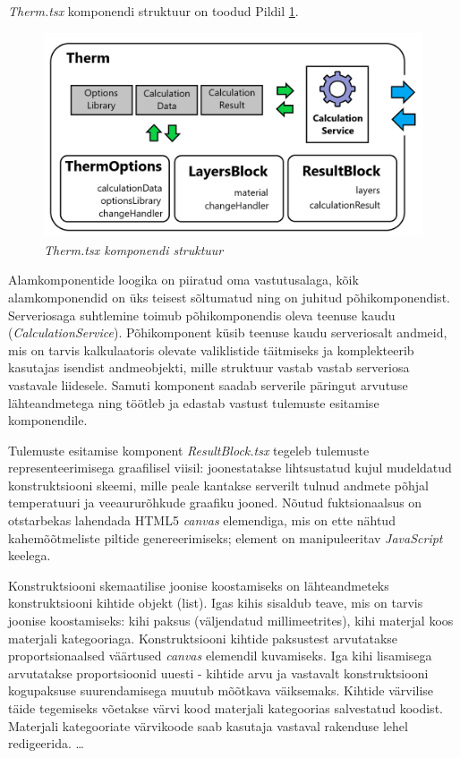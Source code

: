 \textit{Therm.tsx} komponendi struktuur on toodud Pildil \ref{fig:development_frontend_therm}.
\begin{figure}[ht]
    \centering
    \includegraphics[width=1\textwidth]{figures/development/frontend_term_structure.png}
    \caption[Kasutajaliidese komponendi \textit{Therm.tsx} struktuur]{\textit{Therm.tsx komponendi struktuur}}
    \label{fig:development_frontend_therm}
\end{figure}

Alamkomponentide loogika on piiratud oma vastutusalaga, kõik alamkomponendid on üks teisest sõltumatud ning on juhitud põhikomponendist. Serveriosaga suhtlemine toimub põhikomponendis
oleva teenuse kaudu (\textit{CalculationService}). Põhikomponent küsib teenuse kaudu serveriosalt andmeid, mis on tarvis kalkulaatoris olevate valiklistide täitmiseks ja komplekteerib
kasutajas isendist andmeobjekti, mille struktuur vastab vastab serveriosa vastavale liidesele. Samuti komponent saadab serverile päringut arvutuse lähteandmetega ning 
töötleb ja edastab vastust tulemuste esitamise komponendile.

Tulemuste esitamise komponent \textit{ResultBlock.tsx} tegeleb tulemuste representeerimisega graafilisel viisil: joonestatakse lihtsustatud kujul mudeldatud konstruktsiooni skeemi, 
mille peale kantakse serverilt tulnud andmete põhjal temperatuuri ja veeaururõhkude graafiku jooned. Nõutud fuktsionaalsus on otstarbekas lahendada HTML5 \textit{canvas} elemendiga, mis
on ette nähtud kahemõõtmeliste piltide genereerimiseks; element on manipuleeritav \textit{JavaScript} keelega. 

Konstruktsiooni skemaatilise joonise koostamiseks on lähteandmeteks konstruktsiooni kihtide objekt (list). Igas kihis sisaldub teave, mis on tarvis joonise koostamiseks: 
kihi paksus (väljendatud millimeetrites), kihi materjal koos materjali kategooriaga. 
Konstruktsiooni kihtide paksustest arvutatakse proportsionaalsed väärtused \textit{canvas} elemendil kuvamiseks. Iga kihi lisamisega arvutatakse proportsioonid uuesti - kihtide arvu
ja vastavalt konstruktsiooni kogupaksuse suurendamisega muutub mõõtkava väiksemaks. Kihtide värvilise täide tegemiseks võetakse värvi kood materjali kategoorias salvestatud koodist.
Materjali kategooriate värvikoode saab kasutaja vastaval rakenduse lehel redigeerida. 
\dots

